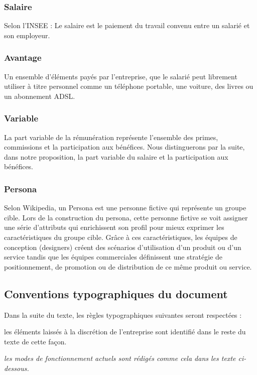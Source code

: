 \documentclass[12pt]{article}
\newcommand{\assemblee}[1]{%
  {\color{DarkPlum} #1}
}
\newcommand{\actuel}[1]{%
  \textit{#1}
}
\begin{document}
\subsubsection{Salaire}
 Selon l’INSEE : Le salaire est le paiement du travail convenu entre un salarié et son employeur. 

\subsubsection{Avantage}
 Un ensemble d’éléments payés par l’entreprise, que le salarié peut librement utiliser à titre personnel comme un téléphone portable, une voiture, des livres ou un abonnement ADSL.

\subsubsection{Variable}
 La part variable de la rémunération représente l’ensemble des primes, commissions et la participation aux bénéfices.
 Nous distinguerons par la suite, dans notre proposition, la part variable du salaire et la participation aux bénéfices.

\subsubsection{Persona}
 Selon Wikipedia, un Persona est une personne fictive qui représente un groupe cible. Lors de la construction du persona, cette personne fictive se voit assigner une série d'attributs qui enrichissent son profil pour mieux exprimer les caractéristiques du groupe cible. Grâce à ces caractéristiques, les équipes de conception (designers) créent des scénarios d'utilisation d'un produit ou d'un service tandis que les équipes commerciales définissent une stratégie de positionnement, de promotion ou de distribution de ce même produit ou service.

\subsection{Conventions typographiques du document}
  Dans la suite du texte, les règles typographiques suivantes seront respectées :

  \assemblee{les éléments laissés à la discrétion de l'entreprise sont identifié dans le reste du texte de cette façon.}

  \actuel{les modes de fonctionnement actuels sont rédigés comme cela dans les texte ci-dessous.}
\end{document}
